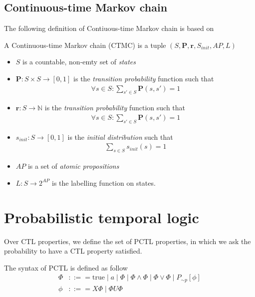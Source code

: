\subsection{Continuous-time Markov chain}
The following definition of Contiuous-time Markov chain is based on \cite{baier2003model}
\begin{definition}
    A Continuous-time Markov chain (CTMC) is a tuple $(S,\mathbf{P}, \mathbf{r}, S_{init}, AP, L)$ \cite{baier2003model}
    \begin{itemize}
        \item $S$ is a countable, non-emty set of \textit{states}
        \item $\mathbf{P}:S\times S \rightarrow [0,1]$ is the \textit{transition probability}
              function such that
              \begin{align*}
                  \forall s \in S : \sum_{s'\in S}\mathbf{P}(s, s') = 1
              \end{align*}
        \item $\mathbf{r}:S \rightarrow \mathbb{N}$ is the \textit{transition probability}
              function such that
              \begin{align*}
                  \forall s \in S : \sum_{s'\in S}\mathbf{P}(s, s') = 1
              \end{align*}
        \item $s_{init}: S \rightarrow [0,1]$ is the \textit{initial distribution} such that
              \begin{align*}
                  \sum_{s\in S}s_{init}(s) = 1
              \end{align*}
        \item $AP$ is a set of \textit{atomic propositions}
        \item $L: S \rightarrow 2^{AP}$ is the labelling function on states.
    \end{itemize}
\end{definition}


\section{Probabilistic temporal logic}
Over CTL properties, we define the set of PCTL properties, in which we ask the probability to have a CTL property satisfied.
\begin{definition} The syntax of PCTL is defined as follow
    \begin{align*}
        \Phi & ::== \text{true} \;|\; a \;|\; \Phi \;|\; \Phi \wedge \Phi \;|\; \Phi \vee \Phi \;|\;  P_{\sim  p}[\phi] \\
        \phi & ::== X\Phi \;|\; \Phi U \Phi
    \end{align*}
\end{definition}



